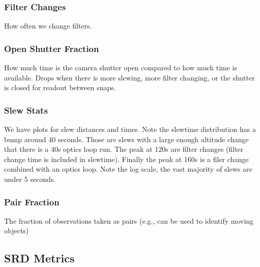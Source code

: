 \subsubsection{Filter Changes}

How often we change filters.


\subsubsection{Open Shutter Fraction}

How much time is the camera shutter open compared to how much time is available. Drops when there is more slewing, more filter changing, or the shutter is closed for readout between snaps.


\subsubsection{Slew Stats}

We have plots for slew distances and times. Note the slewtime distribution has a bump around 40 seconds. Those are slews with a large enough altitude change that there is a 40s optics loop run. The peak at 120s are filter changes (filter change time is included in slewtime). Finally the peak at 160s is a filer change combined with an optics loop. Note the log scale, the vast majority of slews are under 5 seconds.


\subsubsection{Pair Fraction}

The fraction of observations taken as pairs (e.g., can be used to identify moving objects)


\subsection{SRD Metrics}

